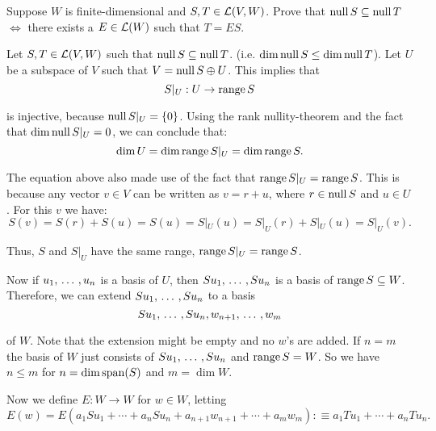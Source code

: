 \begin{xrcs}
  Suppose $W$ is finite-dimensional and $S, T \in \mathcal{L} (V,W)$. Prove that $\operatorname{null} S \subseteq \operatorname{null} T$ $\iff$ there exists a $E \in \mathcal{L} (W)$ such that $T=ES$.

  \begin{prf}
    \Rightarrowdirection Let $S, T \in \mathcal{L} (V,W)$ such that $\operatorname{null} S \subseteq \operatorname{null} T$. (i.e. $\dim \operatorname{null} S \leq \dim \operatorname{null} T$). Let $U$ be a subspace of $V$ such that $V = \operatorname{null} S \oplus U$. This implies that
    \begin{equation}
      S|_U : U \to \operatorname{range} S
    \end{equation}

   is injective, because $\operatorname{null} S|_U = \{0\}$. Using the rank nullity-theorem and the fact that $\dim \operatorname{null} S|_U =0$, we can conclude that:
   \begin{equation}
     \dim U = \dim \operatorname{range} S|_U = \dim \operatorname{range} S.
   \end{equation}

   The equation above also made use of the fact that $\operatorname{range} S|_U = \operatorname{range} S$. This is because any vector $v \in V$ can be written as $v = r + u$, where $r \in \operatorname{null} S$ and $u \in U$. For this $v$ we have:
   \begin{equation}
     S(v) = S(r) + S(u) = S(u) = S|_U(u) = S|_U(r) + S|_U(u)= S|_U(v).
   \end{equation}

   Thus, $S$ and $S|_U$ have the same range, $\operatorname{range} S|_U = \operatorname{range} S$.

   Now if $u_1, {\, \ldots \,\,}, u_n$ is a basis of $U$, then $S u_1, {\, \ldots \,\,}, S u_n$ is a basis of $\operatorname{range} S \subseteq W$. Therefore, we can extend $S u_1, {\, \ldots \,\,}, S u_n$ to a basis
   \begin{equation}
     S u_1, {\, \ldots \,\,}, S u_n, w_{n+1}, {\, \ldots \,\,}, w_{m}
   \end{equation}

   of $W$. Note that the extension might be empty and no $w$'s are added. If $n = m$ the basis of $W$ just consists of $S u_1, {\, \ldots \,\,}, S u_n$ and $\operatorname{range} S = W$. So we have $n \leq m$ for $n = \dim \operatorname{span} (S)$ and $m = \dim W$.

   Now we define $E: W \to W$ for $w \in W$, letting
   \begin{equation}
     E(w) = E(a_1 Su_1 + \cdots + a_n Su_n + a_{n+1} w_{n+1} + \cdots + a_m w_m) :\equiv a_1 T u _1 + \cdots + a_n T u_n.
   \end{equation}


\end{prf}
\end{xrcs}
